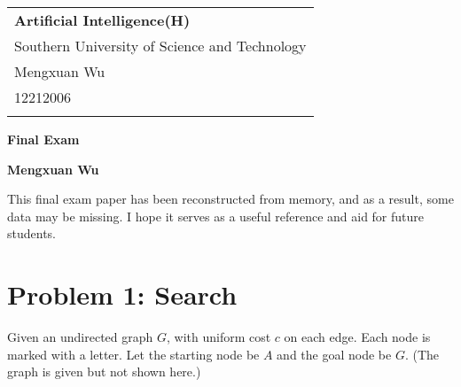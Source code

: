 \documentclass[a4paper,12pt]{article}
\begin{document}



\thispagestyle{empty} %

\begin{tabular}{p{15.5cm}}
{\large \bf Artificial Intelligence(H)} \\
Southern University of Science and Technology \\ Mengxuan Wu \\ 12212006 \\
\hline
\\
\end{tabular}

\vspace*{0.3cm} %

\begin{center}
	{\Large \bf Final Exam}
	\vspace{2mm}

	{\bf Mengxuan Wu}
		
\end{center}  

\vspace{0.4cm}

This final exam paper has been reconstructed from memory, and as a result, some data may be missing. I hope it serves as a useful reference and aid for future students.

\section*{Problem 1: Search}

Given an undirected graph $G$, with uniform cost $c$ on each edge. Each node is marked with a letter. Let the starting node be $A$ and the goal node be $G$. (The graph is given but not shown here.)
\end{document}
